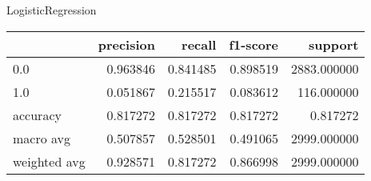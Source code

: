 LogisticRegression
\begin{tabular}{lrrrr}
\toprule
{} &  precision &    recall &  f1-score &      support \\
\midrule
0.0          &   0.963846 &  0.841485 &  0.898519 &  2883.000000 \\
1.0          &   0.051867 &  0.215517 &  0.083612 &   116.000000 \\
accuracy     &   0.817272 &  0.817272 &  0.817272 &     0.817272 \\
macro avg    &   0.507857 &  0.528501 &  0.491065 &  2999.000000 \\
weighted avg &   0.928571 &  0.817272 &  0.866998 &  2999.000000 \\
\bottomrule
\end{tabular}
